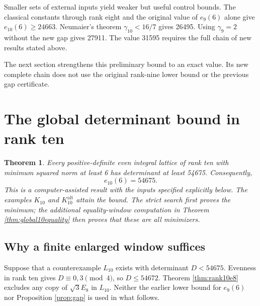 \documentclass[11pt,a4paper]{article}
\newtheorem{theorem}{Theorem}[section]
\theoremstyle{remark}\newtheorem{remark}[theorem]{Remark}
\newcommand{\Kalt}{K_{10}^{\mathrm{alt}}}
\begin{document}
Smaller sets of external inputs yield weaker but useful control bounds. The classical constants through rank eight and the original value of $e_9(6)$ alone give $e_{10}(6)\ge24663$. Neumaier's theorem $\gamma_{10}<16/7$ \cite{neumaier} gives 26495. Using $\gamma_9=2$ without the new gap gives 27911. The value 31595 requires the full chain of new results stated above.

The next section strengthens this preliminary bound to an exact value. Its new complete chain does not use the original rank-nine lower bound or the previous gap certificate.

\section{The global determinant bound in rank ten}\label{sec:global10exact}

\begin{theorem}\label{thm:e10exact}
Every positive-definite even integral lattice of rank ten with minimum squared norm at least 6 has determinant at least 54675. Consequently,
\[
\boxed{e_{10}(6)=54675}.
\]
This is a computer-assisted result with the inputs specified explicitly below. The examples $K_{10}$ and $\Kalt$ attain the bound. The strict search first proves the minimum; the additional equality-window computation in Theorem \ref{thm:global10equality} then proves that these are all minimizers.
\end{theorem}

\subsection{Why a finite enlarged window suffices}

Suppose that a counterexample $L_{10}$ exists with determinant $D<54675$. Evenness in rank ten gives $D\equiv0,3\pmod4$, so $D\le54672$. Theorem \ref{thm:rank10e8} excludes any copy of $\sqrt3E_8$ in $L_{10}$. Neither the earlier lower bound for $e_9(6)$ nor Proposition \ref{prop:gap} is used in what follows.
\end{document}
